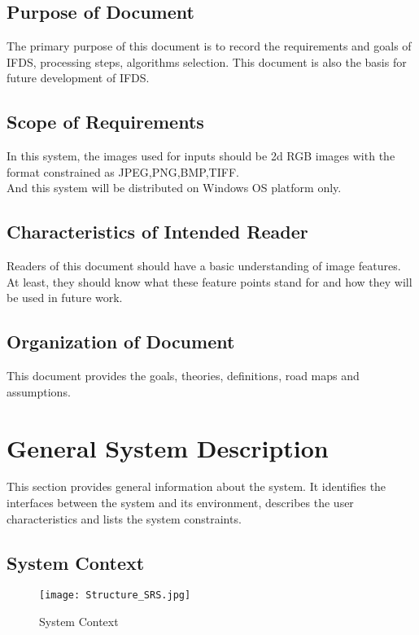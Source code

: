 \documentclass[12pt]{article}
\begin{document}
\subsection{Purpose of Document}

The primary purpose of this document is to  record the requirements and goals of IFDS, processing steps, algorithms selection. This document is also the basis for future development of IFDS.

\subsection{Scope of Requirements} 

In this system, the images used for inputs should be 2d RGB images with the format constrained as JPEG,PNG,BMP,TIFF.\\ And this system will be distributed on Windows OS platform only.

\subsection{Characteristics of Intended Reader} 
Readers of this document should have a basic understanding of image features. At least, they should know what these feature points stand for and how they will be used in future work.\\
\subsection{Organization of Document}

This document provides the goals, theories, definitions, road maps and assumptions.

\section{General System Description}

This section provides general information about the system.  It identifies the interfaces between the system and its environment, describes the user characteristics and lists the system constraints.  


\subsection{System Context}

\begin{figure}[h!]
\begin{center}
    \centering
    \texttt{[image: Structure\_SRS.jpg]}
    \caption{System Context}
    \label{fig_SystemContext}
\end{center}  
\end{figure}
\end{document}
